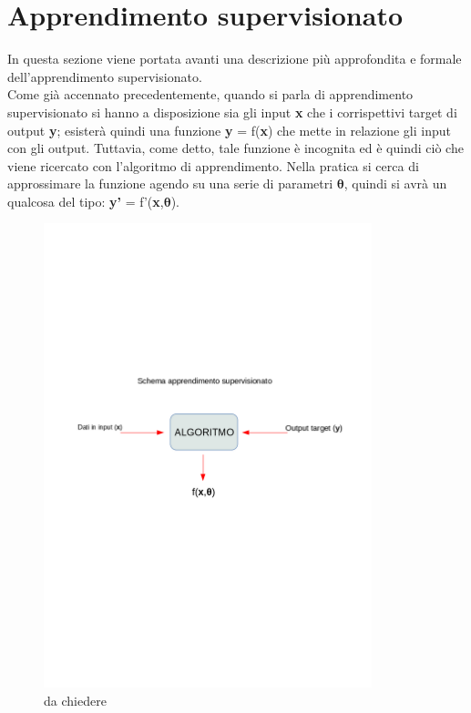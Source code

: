 %
\section{Apprendimento supervisionato}
\label{sec:apprendimento supervisionato}
In questa sezione viene portata avanti una descrizione più approfondita e formale dell'apprendimento supervisionato.\\
Come già accennato precedentemente, quando si parla di apprendimento supervisionato si hanno a disposizione sia gli input \textbf{x} che i corrispettivi target di output \textbf{y}; esisterà quindi una funzione 
\textbf{y} = f(\textbf{x}) che mette in relazione gli input con gli output. Tuttavia, come detto, tale funzione è incognita ed è quindi ciò che viene ricercato con l'algoritmo di apprendimento.
Nella pratica si cerca di approssimare la funzione agendo su una serie di parametri $\bm{\theta}$, quindi si avrà un qualcosa del tipo: \textbf{y'} = f'(\textbf{x},$\bm{\theta}$). \\

\begin{figure}[]
	\centering
	\includegraphics[width=0.85\textwidth]{figs/app_sup.png}
	\caption{da chiedere}
	\label{fig:feat_distr}
\end{figure}

